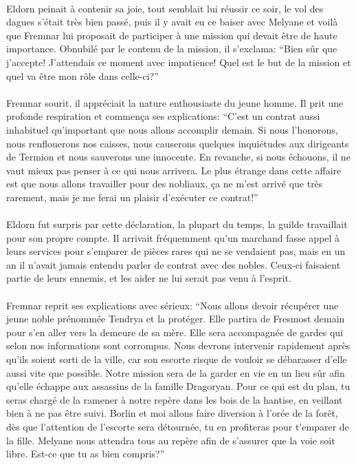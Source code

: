 \paragraph{}
Eldorn peinait à contenir sa joie, tout semblait lui réussir ce soir, le vol
des dagues s'était très bien passé, puis il y avait eu ce baiser avec Melyane
et voilà que Fremnar lui proposait de participer à une mission qui devait être
de haute importance. Obnubilé par le contenu de la mission, il s'exclama:
``Bien sûr que j'accepte! J'attendais ce moment avec impatience! Quel est le
but de la mission et quel va être mon rôle dans celle-ci?''

\paragraph{}
Fremnar sourit, il appréciait la nature enthousiaste du jeune homme. Il prit
une profonde respiration et commença ses explications: ``C'est un contrat
aussi inhabituel qu'important que nous allons accomplir demain. Si nous
l'honorons, nous renflouerons nos caisses, nous causerons quelques inquiétudes
aux dirigeants de Termion et nous sauverons une innocente. En revanche, si
nous échouons, il ne vaut mieux pas penser à ce qui nous arrivera. Le plus
étrange dans cette affaire est que nous allons travailler pour des nobliaux,
ça ne m'est arrivé que très rarement, mais je me ferai un plaisir d'exécuter
ce contrat!''

\paragraph{}
Eldorn fut surpris par cette déclaration, la plupart du temps, la guilde
travaillait pour son propre compte. Il arrivait fréquemment qu'un marchand
fasse appel à leurs services pour s'emparer de pièces rares qui ne se
vendaient pas, mais en un an il n'avait jamais entendu parler de contrat avec
des nobles. Ceux-ci faisaient partie de leurs ennemis, et les aider ne lui
serait pas venu à l'esprit.

\paragraph{}
Fremnar reprit ses explications avec sérieux: ``Nous allons devoir récupérer
une jeune noble prénommée Tendrya et la protéger. Elle partira de Fresmost
demain pour s'en aller vers la demeure de sa mère. Elle sera accompagnée de
gardes qui selon nos informations sont corrompus. Nous devrons intervenir
rapidement après qu'ils soient sorti de la ville, car son escorte risque de
vouloir se débarasser d'elle aussi vite que possible. Notre mission sera de la
garder en vie en un lieu sûr afin qu'elle échappe aux assassins de la famille
Dragoryan. Pour ce qui est du plan, tu seras chargé de la ramener à notre
repère dans les bois de la hantise, en veillant bien à ne pas être suivi.
Borlin et moi allons faire diversion à l'orée de la forêt, dès que l'attention
de l'escorte sera détournée, tu en profiteras pour t'emparer de la fille.
Melyane nous attendra tous au repère afin de s'assurer que la voie soit
libre. Est-ce que tu as bien compris?''

